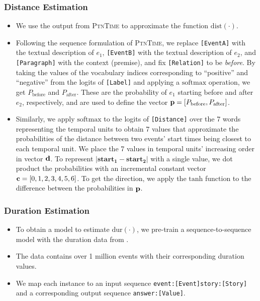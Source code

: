 \documentclass[10pt,aspectratio=43]{beamer}
\newcommand{\keywordCode}[1]{{\small \texttt{#1}}}
\newcommand{\modelpattern}{\textsc{PtnTime}}
\begin{document}
	\begin{frame}
	    \frametitle{\textbf{Distance Estimation}}
	    \begin{itemize}
	        \item We use the output from \modelpattern{} to approximate the function $\mathrm{dist}(\cdot)$.
	        \item Following the sequence formulation of \modelpattern{}, we replace \keywordCode{[EventA]} with the textual description of $e_1$, \keywordCode{[EventB]} with the textual description of $e_2$, and \keywordCode{[Paragraph]} with the context (premise), and fix \keywordCode{[Relation]} to be \textit{before}. By taking the values of the vocabulary indices corresponding to ``positive'' and ``negative'' from the logits of \keywordCode{[Label]} and applying a $\mathrm{softmax}$ operation, we get $P_{\textrm{before}}$ and $P_{\textrm{after}}$. These are the probability of $e_1$ starting before and after $e_2$, respectively, and are used to define the vector $\vb{p}=[P_{\textrm{before}}, P_{\textrm{after}}]$.
	        \item Similarly, we apply $\mathrm{softmax}$ to the logits of \keywordCode{[Distance]} over the 7 words representing the temporal units to obtain 7 values that approximate the probabilities of the distance between two events' start times being closest to each temporal unit. We place the 7 values in temporal units' increasing order in vector $\vb{d}$. To represent $|\mathbf{start_1}-\mathbf{start_2}|$ with a single value, we dot product the probabilities with an incremental constant vector $\vb{c}=[0,1,2,3,4,5,6]$. To get the direction, we apply the $\mathrm{tanh}$ function to the difference between the probabilities in $\vb{p}$.
	    \end{itemize}
	\end{frame}	
	
	\begin{frame}
	    \frametitle{\textbf{Duration Estimation}}
	    \begin{itemize}
	        \item To obtain a model to estimate $\mathrm{dur}(\cdot)$, we pre-train a sequence-to-sequence model with the duration data from \cite{zhou-etal-2020-temporal}.
	        \item The data contains over 1 million events with their corresponding duration values.
	        \item We map each instance to an input sequence \keywordCode{event:[Event]story:[Story]} and a corresponding output sequence \keywordCode{answer:[Value]}.
	    \end{itemize}

	\end{frame}
	
\end{document}
